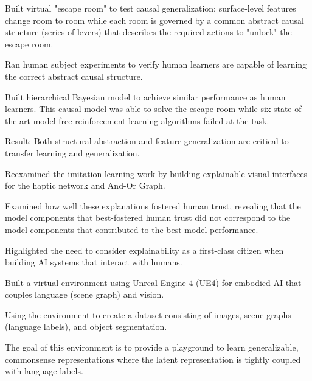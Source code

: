 \begin{cventries}
{\begin{flushleft}
\end{flushleft}
\vspace{-1mm}
\begin{cvitems}
  \item Built virtual "escape room" to test causal generalization; surface-level features change room to room while each room is governed by a common abstract causal structure (series of levers) that describes the required actions to "unlock" the escape room.
  \item Ran human subject experiments to verify human learners are capable of learning the correct abstract causal structure.
  \item Built hierarchical Bayesian model to achieve similar performance as human learners.  This causal model was able to solve the escape room while six state-of-the-art model-free reinforcement learning algorithms failed at the task.
  \item Result: Both structural abstraction and feature generalization are critical to transfer learning and generalization.
\end{cvitems}
%
\begin{flushleft}
\end{flushleft}
\vspace{-1mm}
\begin{cvitems}
  \item Reexamined the imitation learning work by building explainable visual interfaces for the haptic network and And-Or Graph.
  \item Examined how well these explanations fostered human trust, revealing that the model components that best-fostered human trust did not correspond to the model components that contributed to the best model performance.
  \item Highlighted the need to consider explainability as a first-class citizen when building AI systems that interact with humans.
\end{cvitems}
%
\begin{flushleft}
\end{flushleft}
\vspace{-1mm}
\begin{cvitems}
  \item Built a virtual environment using Unreal Engine 4 (UE4) for embodied AI that couples language (scene graph) and vision.
  \item Using the environment to create a dataset consisting of images, scene graphs (language labels), and object segmentation.
  \item The goal of this environment is to provide a playground to learn generalizable, commonsense representations where the latent representation is tightly coupled with language labels.
\end{cvitems}
}


\end{cventries}
